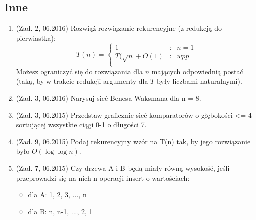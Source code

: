 \documentclass[10pt]{article}%
\begin{document}
\subsection*{Inne}
\begin{enumerate}
\item (Zad. 2, 06.2016) Rozwiąż rozwiązanie rekurencyjne (z redukcją do pierwiastka):
$$T(n) = \left\{\begin{array}{rcl}
1&:&n=1\\
T(\sqrt{n}+O(1)&:&wpp\\
\end{array} \right.$$
Możesz ograniczyć się do rozwiązania dla $n$ mających odpowiednią postać (taką, by w trakcie redukcji argumenty dla $T$ były liczbami naturalnymi).

\item (Zad. 3, 06.2016) Narysuj sieć Benesa-Waksmana dla n = 8.

\item (Zad. 3, 06.2015) Przedstaw graficznie sieć komparatorów o głębokości <= 4 sortującej wszystkie ciągi 0-1 o długości 7.

\item (Zad. 9, 06.2015) Podaj rekurencyjny wzór na T(n) tak, by jego rozwiązanie było $O(\log \log n)$.

\item (Zad. 7, 06.2015) Czy drzewa A i B będą miały równą wysokość, jeśli przeprowadzi się na nich n operacji insert o wartościach:
\begin{itemize}
\item dla A: 1, 2, 3, ..., n 
\item dla B: n, n-1, ..., 2, 1 
\end{itemize}
\end{enumerate}
\end{document}
